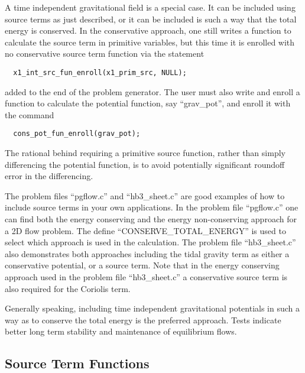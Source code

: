 A time independent gravitational field is a special case.  It can be
included using source terms as just described,  or it can be included
is such a way that the total energy is conserved.  In the conservative
approach, one still writes a function to calculate the source term in
primitive variables, but this time it is enrolled with no conservative
source term function via the statement
\footnotesize
\begin{verbatim}
  x1_int_src_fun_enroll(x1_prim_src, NULL);
\end{verbatim}
\normalsize
added to the end of the problem generator.   The user must also
write and enroll a function to calculate the potential function, say
``grav\_pot'', and enroll it with the command
\footnotesize
\begin{verbatim}
  cons_pot_fun_enroll(grav_pot);
\end{verbatim}
\normalsize
The rational behind requiring
a primitive source function, rather than simply differencing the
potential function, is to avoid potentially significant roundoff error
in the differencing.

The problem files ``pgflow.c'' and ``hb3\_sheet.c'' are good examples
of how to include source terms in your own applications.  In the
problem file ``pgflow.c'' one can find both the energy conserving and
the energy non-conserving approach for a 2D flow problem.  The define
\mbox{``CONSERVE\_TOTAL\_ENERGY''} is used to select which approach is used in
the calculation.  The problem file ``hb3\_sheet.c'' also demonstrates
both approaches including the tidal gravity term as either a
conservative potential, or a source term.  Note that in the energy
conserving approach used in the problem file ``hb3\_sheet.c'' a
conservative source term is also required for the Coriolis term.

Generally speaking, including time independent gravitational
potentials in such a way as to conserve the total energy is the
preferred approach.  Tests indicate better long term stability and
maintenance of equilibrium flows.

\subsection{Source Term Functions}

